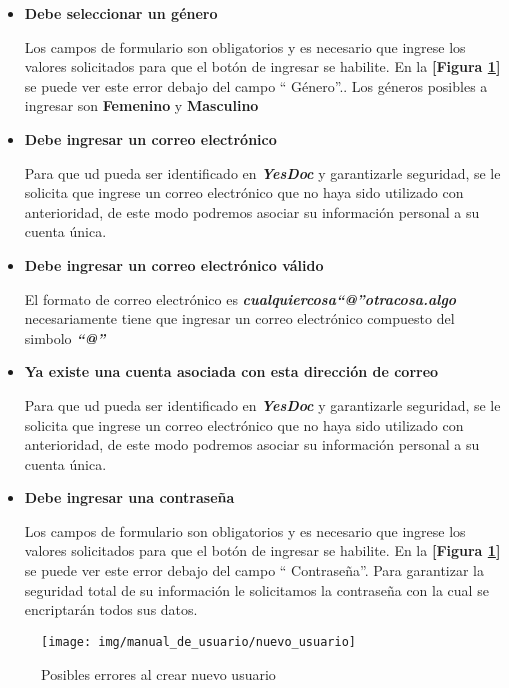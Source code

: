 \begin{itemize}
	\item \textbf{Debe seleccionar un género}
	
		Los campos de formulario son obligatorios y es necesario que ingrese los valores solicitados para que el botón de ingresar se habilite. En la	\textbf{[Figura \ref{mu-nuevo_usuario}]} se puede ver este error debajo del campo `` Género''.. Los géneros posibles a ingresar son \textbf{Femenino} y \textbf{Masculino}
		
	\item \textbf{Debe ingresar un correo electrónico}
	
		Para que ud pueda ser identificado en \textbf{\textit{YesDoc}} y garantizarle seguridad, se le solicita que ingrese un correo electrónico que no haya sido utilizado con anterioridad, de este modo podremos asociar su información personal a su cuenta única.
		
	\item \textbf{Debe ingresar un correo electrónico válido}	
	
	El formato de correo electrónico  es \textbf{\textit{cualquiercosa``@''otracosa.algo}} necesariamente tiene que ingresar un correo electrónico compuesto del simbolo \textbf{\textit{``@''}}
	
	\item \textbf{Ya existe una cuenta asociada con esta dirección de correo}			
	
			Para que ud pueda ser identificado en \textbf{\textit{YesDoc}} y garantizarle seguridad, se le solicita que ingrese un correo electrónico que no haya sido utilizado con anterioridad, de este modo podremos asociar su información personal a su cuenta única.
			
	\item \textbf{Debe ingresar una contraseña}	
	
		Los campos de formulario son obligatorios y es necesario que ingrese los valores solicitados para que el botón de ingresar se habilite.	 En la \textbf{[Figura \ref{mu-nuevo_usuario}]} se puede ver este error debajo del campo `` Contraseña''. Para garantizar la seguridad total de su información le solicitamos la contraseña con la cual se encriptarán todos sus datos.
		
\end{itemize}
 \begin{figure}
 	\centering
 	\texttt{[image: img/manual\_de\_usuario/nuevo\_usuario]}
 	\caption{Posibles errores al crear nuevo usuario}
 	\label{mu-nuevo_usuario}
 \end{figure}


